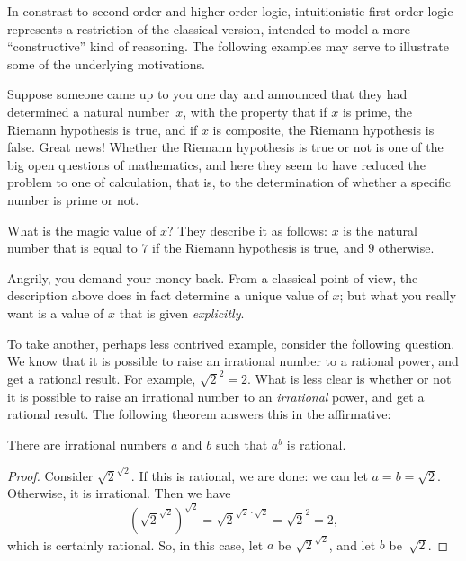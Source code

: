 \documentclass[../../../include/open-logic-section]{subfiles}
\begin{document}


In constrast to second-order and higher-order logic, intuitionistic
first-order logic represents a restriction of the classical version,
intended to model a more ``constructive'' kind of reasoning. The
following examples may serve to illustrate some of the underlying
motivations.

Suppose someone came up to you one day and announced that they had
determined a natural number~$x$, with the property that if $x$ is
prime, the Riemann hypothesis is true, and if $x$ is composite, the
Riemann hypothesis is false. Great news!{} Whether the Riemann
hypothesis is true or not is one of the big open questions of
mathematics, and here they seem to have reduced the problem to one of
calculation, that is, to the determination of whether a specific
number is prime or not.

What is the magic value of $x$? They describe it as follows: $x$ is
the natural number that is equal to $7$ if the Riemann hypothesis is
true, and $9$ otherwise.

Angrily, you demand your money back. From a classical point of view,
the description above does in fact determine a unique value of $x$;
but what you really want is a value of $x$ that is given
\emph{explicitly}.

To take another, perhaps less contrived example, consider the
following question. We know that it is possible to raise an irrational
number to a rational power, and get a rational result. For example,
$\sqrt{2}^2 = 2$. What is less clear is whether or not it is possible
to raise an irrational number to an \emph{irrational} power, and get a
rational result. The following theorem answers this in the
affirmative:

\begin{thm}
There are irrational numbers $a$ and $b$ such that $a^b$ is rational.
\end{thm}

\begin{proof}
Consider $\sqrt{2}^{\sqrt{2}}$. If this is rational, we are done:
we can let $a = b = \sqrt{2}$. Otherwise, it is irrational. Then we
have
\[
(\sqrt{2}^{\sqrt{2}})^{\sqrt{2}} = \sqrt{2}^{\sqrt{2} \cdot
  \sqrt{2}} = \sqrt{2}^2 = 2,
\]
which is certainly rational. So, in this case, let $a$ be
$\sqrt{2}^{\sqrt{2}}$, and let $b$ be~$\sqrt 2$.
\end{proof}
\end{document}
